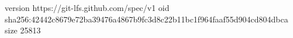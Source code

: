 version https://git-lfs.github.com/spec/v1
oid sha256:42442c8679e72ba39476a4867b9fc3d8c22b11bc1f964faaf55d904cd804dbca
size 25813
